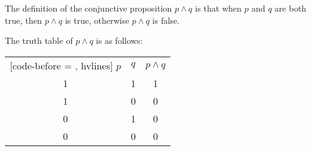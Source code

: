 \documentclass{report}
\begin{document}
The definition of the conjunctive proposition $p \land q$ is that when $p$ and
$q$ are both true, then $p \land q$ is true, otherwise $p \land q$ is false.

The truth table of $p \land q$ is as follows:
\begin{center}
    \begin{NiceTabular}{|c|c|c|}[code-before = , hvlines]
        $p$ & $q$ & $p \land q$ \\
        1   & 1   & 1           \\
        1   & 0   & 0           \\
        0   & 1   & 0           \\
        0   & 0   & 0           \\
    \end{NiceTabular}
\end{center}
\end{document}
